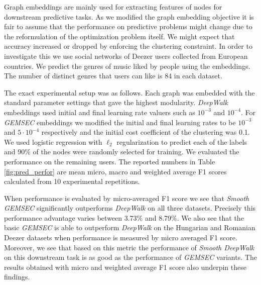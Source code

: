 Graph embeddings are mainly used for extracting features of nodes for downstream predictive tasks. As we modified the graph embedding objective it is fair to assume that the performance on predictive problems might change due to the reformulation of the optimization problem itself. We might expect that accuracy increased or dropped by enforcing the clustering constraint. In order to investigate this we use social networks of Deezer users collected from European countries. We predict the genres of music liked by people using the embeddings. The number of distinct genres that users can like is 84 in each dataset. 

The exact experimental setup was as follows. Each graph was embedded with the standard parameter settings that gave the highest modularity. \textit{DeepWalk} embeddings used initial and final learning rate valuers such as $10^{-3}$ and $10^{-4}$. For \textit{GEMSEC} embeddings we modified the initial and final learning rates to be $10^{-3}$ and $5\cdot 10^{-4}$ respectively and the initial cost coefficient of the clustering was 0.1. We used logistic regression with $\ell_2$ regularization to predict each of the labels and 90\% of the nodes were randomly selected for training. We evaluated the performance on the remaining users. The reported numbers in Table \ref{fig:pred_perfor} are mean micro, macro and weighted average F1 scores calculated from 10 experimental repetitions.

When performance is evaluated by micro-averaged F1 score we see that \textit{Smooth GEMSEC} significantly outperforms \textit{DeepWalk} on all three datasets. Precisely this performance advantage varies between 3.73\% and 8.79\%. We also see that the basic \textit{GEMSEC} is able to outperform \textit{DeepWalk} on the Hungarian and Romanian Deezer datasets when performance is measured by micro averaged F1 score. Moreover, we see that based on this metric the performance of \textit{Smooth DeepWalk} on this downstream task is as good as the performance of \textit{GEMSEC} variants. The results obtained with micro and weighted average F1 score also underpin these findings.

